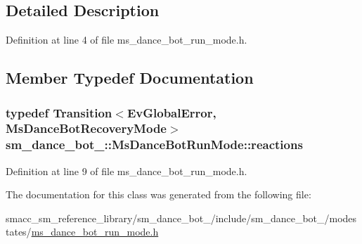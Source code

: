 \subsection{Detailed Description}


Definition at line 4 of file ms\+\_\+dance\+\_\+bot\+\_\+run\+\_\+mode.\+h.



\subsection{Member Typedef Documentation}
\subsubsection[{\texorpdfstring{reactions}{reactions}}]{\setlength{\rightskip}{0pt plus 5cm}typedef Transition$<${\bf Ev\+Global\+Error}, {\bf Ms\+Dance\+Bot\+Recovery\+Mode}$>$ {\bf sm\+\_\+dance\+\_\+bot\+\_\+::\+Ms\+Dance\+Bot\+Run\+Mode\+::reactions}}\hypertarget{classsm__dance__bot__3_1_1MsDanceBotRunMode_a46456b0d07e3e339cb6bafb68c923cca}{}\label{classsm__dance__bot__3_1_1MsDanceBotRunMode_a46456b0d07e3e339cb6bafb68c923cca}


Definition at line 9 of file ms\+\_\+dance\+\_\+bot\+\_\+run\+\_\+mode.\+h.



The documentation for this class was generated from the following file\+:\begin{DoxyCompactItemize}
\item 
smacc\+\_\+sm\+\_\+reference\+\_\+library/sm\+\_\+dance\+\_\+bot\+\_/include/sm\+\_\+dance\+\_\+bot\+\_/modestates/\hyperlink{3_2include_2sm__dance__bot__3_2modestates_2ms__dance__bot__run__mode_8h}{ms\+\_\+dance\+\_\+bot\+\_\+run\+\_\+mode.\+h}\end{DoxyCompactItemize}
